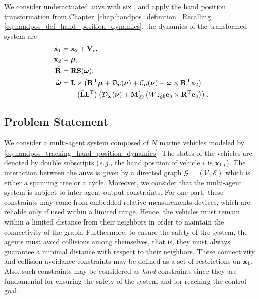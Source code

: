 We consider underactuated \glspl{auv} with six , and apply the hand position transformation from Chapter~\ref{chap:handpos_definition}.
Recalling \eqref{eq:handpos_def_hand_position_dynamics}, the dynamics of the transformed system are
\begin{subequations}
    \begin{align}
        \dot{\mathbf{x}}_1 &= \mathbf{x}_2 + \mathbf{V}_c, \label{eq:handpos_tracking_x_1_dot_transformed}\\
        \dot{\mathbf{x}}_2 &= \bm{\mu}, \label{eq:handpos_tracking_x_2_dot_transformed}\\
        \dot{\mathbf{R}} &= \mathbf{R}\mathbf{S}(\bm{\omega}), \label{eq:handpos_tracking_R_dot_CL} \\
        \dot{\bm{\omega}} &= \Bar{\mathbf{L}} \times \left(\mathbf{R}^{\mathrm{T}}\bm{\mu} + \mathcal{D}_{\bm{\upsilon}}(\bm{\nu}) + \mathcal{C}_{\bm{\upsilon}}(\bm{\nu}) - \bm{\omega} \times \mathbf{R}^{\mathrm{T}} \mathbf{x}_2\right) \label{eq:handpos_tracking_omega_dot_CL} \\
            & \quad - \left(\Bar{\mathbf{L}}\mathbf{L}^{\mathrm{T}}\right) \left(\mathcal{D}_{\bm{\omega}}(\bm{\nu}) + \mathbf{M}_{22}^{\prime}\left(Wz_{gb} \mathbf{e}_3 \times \mathbf{R}^{\mathrm{T}} \mathbf{e}_3\right)\right). \nonumber
    \end{align} \label{eq:handpos_tracking_hand_position_dynamics}
\end{subequations}

\subsection{Problem Statement}

We consider a multi-agent system composed of $N$ marine vehicles modeled by \eqref{eq:handpos_tracking_hand_position_dynamics}.
The states of the vehicles are denoted by double subscripts (\emph{e.g.,} the hand position of vehicle $i$ is $\mathbf{x}_{1, i}$).
The interaction between the \glspl{auv} is given by a directed graph $\mathcal{G}=(\mathcal{V},\mathcal{E})$ which is either a spanning tree or a cycle.
Moreover, we consider that the multi-agent system is subject to inter-agent output constraints.
For one part, these constraints may come from embedded relative-measurements devices, which are reliable only if used within a limited range. Hence, the vehicles must remain within a limited distance from their neighbors in order to maintain the connectivity of the graph.
Furthermore, to ensure the safety of the system, the agents must avoid collisions among themselves, that is, they must always guarantee a minimal distance with respect to their neighbors.
These connectivity and collision-avoidance constraints may be defined as a set of restrictions on $\mathbf{x}_1$. Also, such constraints may be considered as \emph{hard} constraints since they are fundamental for ensuring the safety of the system and for reaching the control goal.

